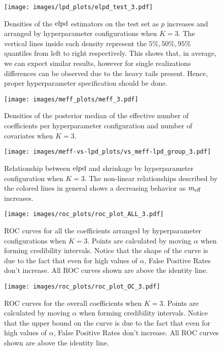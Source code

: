  \begin{figure}[H]%
	\centering
	\texttt{[image: images/lpd\_plots/elpd\_test\_3.pdf]}
	\caption{ Densities of the $\text{elpd}$ estimators on the test set as $p$ increases and arranged by hyperparameter configurations when $K=3$. The vertical lines inside each density represent the $5\%, 50\%, 95\%$ quantiles from left to right respectively. This shows that, in average, we can expect similar results, however for single realizations differences can be observed due to the heavy tails present. Hence, proper hyperparameter specification should be done.  }
	\label{fig:lpd_test_3_ridges}
\end{figure}
 \begin{figure}[H]%
	\centering
	\texttt{[image: images/meff\_plots/meff\_3.pdf]}
	\caption{Densities of the posterior median of the effective number of coefficients per hyperparameter configuration and number of covariates when $K=3$. }
	\label{fig:post_meff_3}
\end{figure}

\begin{figure}[H]%
	\centering
	\texttt{[image: images/meff-vs-lpd\_plots/vs\_meff-lpd\_group\_3.pdf]}
	\caption{Relationship between $\text{elpd}$ and shrinkage by hyperparameter configuration when $K=3$. The non-linear relationships described by the colored lines in general shows a decreasing behavior as $m_{\text{eff} }$ increases. }
	\label{fig:meff-vs-lpd-grouped_3}
\end{figure}

\begin{figure}[H]%
	\centering
	\texttt{[image: images/roc\_plots/roc\_plot\_ALL\_3.pdf]}
	\caption{ROC curves for all the coefficients arranged by hyperparameter configurations when $K=3$. Points are calculated by moving $\alpha$ when forming credibility intervals. Notice that the shape of the curve is due to the fact that even for high values of $\alpha$, False Positive Rates don't increase. All ROC curves shown are above the identity line.}
	\label{fig:roc_ALL_3}
\end{figure}
 \begin{figure}[H]%
	\centering
	\texttt{[image: images/roc\_plots/roc\_plot\_OC\_3.pdf]}
	\caption{ROC curves for the overall coefficients when $K=3$. Points are calculated by moving $\alpha$ when forming credibility intervals. Notice that the upper bound on the curve is due to the fact that even for high values of $\alpha$, False Positive Rates don't increase. All ROC curves shown are above the identity line.}
	\label{fig:roc_OC_3}
\end{figure}
